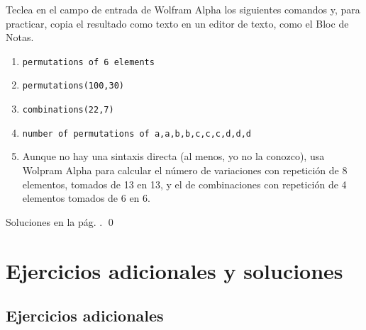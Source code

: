 \documentclass[10pt,a4paper]{article}\usepackage[]{graphicx}\usepackage[]{color}
\begin{document}
\begin{ejercicio}
\label{tut03:ejercicio15}
\quad
Teclea en el campo de entrada de Wolfram Alpha los siguientes comandos y, para practicar, copia el resultado como texto en un editor de texto, como el Bloc de Notas.
\begin{enumerate}
  \item {\tt permutations of 6 elements}
  \item {\tt permutations(100,30)}
  \item {\tt combinations(22,7)}
  \item {\tt number of permutations of {a,a,b,b,c,c,c,d,d,d}}
  \item Aunque no hay una sintaxis directa (al menos, yo no la conozco), usa Wolpram Alpha para calcular el número de variaciones con repetición de 8 elementos, tomados de 13 en 13, y el de combinaciones con repetición de 4 elementos tomados de 6 en 6.
\end{enumerate}
Soluciones en la pág. \pageref{tut03:ejercicio15:sol}.
\qed
\end{ejercicio}


\section{Ejercicios adicionales y soluciones}
\label{tut03:sec:SolucionesEjerciciosAdicionales}

\subsection*{Ejercicios adicionales}
\label{tut03:subsec:EjerciciosAdicionales}
\end{document}
